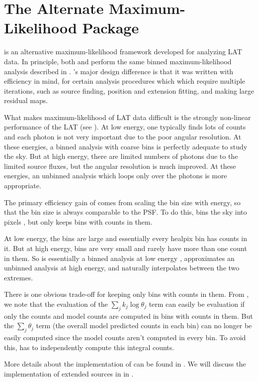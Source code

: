 \section{The Alternate Maximum-Likelihood Package \pointlike}

\pointlike is an alternative maximum-likelihood framework developed
for analyzing \ac{LAT} data. In principle, both \pointlike and \gtlike
perform the same binned maximum-likelihood analysis described in
. \pointlike's major design difference
is that it was written with efficiency in mind, for certain analysis
procedures which which require multiple iterations, such as source
finding, position and extension fitting, and making large residual
\ts maps.

What makes maximum-likelihood of \ac{LAT} data difficult
is the strongly non-linear performance of the \ac{LAT} (see
). At low energy, one typically finds lots
of counts and each photon is not very important due to the poor angular
resolution. At these energies, a binned analysis with coarse bins is
perfectly adequate to study the sky.  But at high energy, there are
limited numbers of photons due to the limited source fluxes, but the
angular resolution is much improved.  At these energies, an unbinned
analysis which loops only over the photons is more appropriate.

The primary efficiency gain of \pointlike comes from scaling the bin
size with energy, so that the bin size is always comparable to the
\ac{PSF}.  To do this, \pointlike bins the sky into \healpix pixels
\citep{gorski_2005_healpix:-framework}, but only keeps bins with counts
in them.

At low energy, the bins are large and essentially every healpix bin
has counts in it.  But at high energy, bins are very small and rarely
have more than one count in them.  So \pointlike is essentially a binned
analysis at low energy , approximates an unbinned analysis at high energy,
and naturally interpolates between the two extremes.

There is one obvious trade-off for keeping only bins with counts in them.
From , we note that the evaluation
of the $\sum_j k_j\log\theta_j$ term can easily be evaluation if only
the counts and model counts are computed in bins with counts in them.
But the $\sum_j \theta_j$ term (the overall model predicted counts in
each bin) can no longer be easily computed since the model counts aren't
computed in every bin. To avoid this, \pointlike has to independently
compute this integral counts.

More details about the implementation of \pointlike can be found in
\cite{kerr_2010a_likelihood-methods}. We will discuss the implementation
of extended sources in \pointlike in .

